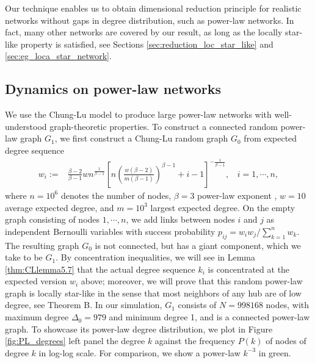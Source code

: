 \documentclass[a4paper]{article}
\theoremstyle{plain}
\theoremstyle{definition}
\begin{document}
Our technique enables us to obtain dimensional reduction principle for realistic networks without gaps in degree distribution, such as power-law networks. In fact, many other networks are covered by our result, as long as the locally star-like property is satisfied, see Sections \ref{sec:reduction_loc_star_like} and \ref{sec:eg_loca_star_network}.


\subsection{Dynamics on power-law networks} \label{sec:intro_PL}
We use the Chung-Lu model  \cite{Chung_2006} to produce large power-law networks with well-understood graph-theoretic properties. %
To construct a connected random power-law graph $G_1$, 
we first construct a Chung-Lu random graph $G_0$ from expected degree sequence
\begin{equation} \label{eq:ChungLu_PL_w_sequence}
	\begin{aligned}
		w_i:=& \frac{\beta-2}{\beta-1} w n^{\frac{1}{\beta-1}} \left[n\left(\frac{w(\beta-2)}{m(\beta-1)}\right)^{\beta-1} +i-1\right]^{-\frac{1}{\beta-1}},~~~~i=1,\cdots,n,
	\end{aligned}
\end{equation}
where $n=10^6$ denotes the number of nodes, $\beta=3$ power-law exponent , $w=10$ average expected degree, and $m=10^3$ largest expected degree. On the empty graph consisting of nodes $1,\cdots,n$, we add links between nodes $i$ and $j$ as independent Bernoulli variables with success probability $p_{ij} = w_iw_j/\sum_{k=1}^nw_k$. The resulting graph $G_0$ is not connected, but has a giant component, which we take to be $G_1$. By concentration inequalities, we will see in Lemma \ref{thm:CLlemma5.7} that the actual degree sequence $k_i$ is concentrated at the expected version $w_i$ above; moreover, we will prove that this random power-law graph is locally star-like in the sense that most neighbors of any hub are of low degree, see Theorem B. In our simulation, $G_1$ consists of $N=998168$ nodes, with maximum degree $\Delta_0=979$ and minimum degree 1, and is a connected power-law graph. To showcase its power-law degree distribution, we plot in Figure \ref{fig:PL_degrees} left panel the degree $k$ against the frequency $P(k)$ of nodes of degree $k$ in log-log scale. For comparison, we show a power-law $k^{-3}$ in green. %
\end{document}
